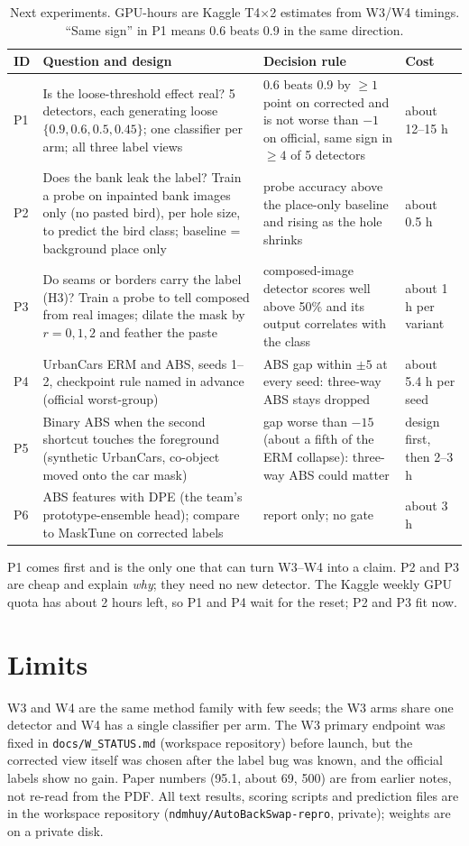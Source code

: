\documentclass[runningheads]{llncs}
\begin{document}
\begin{table}[H]
\centering
\caption{Next experiments. GPU-hours are Kaggle T4$\times$2 estimates from W3/W4 timings. ``Same sign'' in P1 means 0.6 beats 0.9 in the same direction.}
\label{tab:prop}
\small
\begin{tabular}{@{}p{0.8cm}p{4.4cm}p{4.7cm}p{2.1cm}@{}}
\toprule
ID & Question and design & Decision rule & Cost\\
\midrule
P1 & Is the loose-threshold effect real? 5 detectors, each generating loose $\{0.9,0.6,0.5,0.45\}$; one classifier per arm; all three label views & 0.6 beats 0.9 by $\ge1$ point on corrected and is not worse than $-1$ on official, same sign in $\ge4$ of 5 detectors & about 12--15 h\\
P2 & Does the bank leak the label? Train a probe on inpainted bank images only (no pasted bird), per hole size, to predict the bird class; baseline = background place only & probe accuracy above the place-only baseline and rising as the hole shrinks & about 0.5 h\\
P3 & Do seams or borders carry the label (H3)? Train a probe to tell composed from real images; dilate the mask by $r=0,1,2$ and feather the paste & composed-image detector scores well above 50\% and its output correlates with the class & about 1 h per variant\\
P4 & UrbanCars ERM and ABS, seeds 1--2, checkpoint rule named in advance (official worst-group) & ABS gap within $\pm5$ at every seed: three-way ABS stays dropped & about 5.4 h per seed\\
P5 & Binary ABS when the second shortcut touches the foreground (synthetic UrbanCars, co-object moved onto the car mask) & gap worse than $-15$ (about a fifth of the ERM collapse): three-way ABS could matter & design first, then 2--3 h\\
P6 & ABS features with DPE (the team's prototype-ensemble head); compare to MaskTune on corrected labels & report only; no gate & about 3 h\\
\bottomrule
\end{tabular}
\end{table}

P1 comes first and is the only one that can turn W3--W4 into a claim. P2 and P3 are cheap and explain \emph{why}; they need no new detector. The Kaggle weekly GPU quota has about 2 hours left, so P1 and P4 wait for the reset; P2 and P3 fit now.

\section{Limits}

W3 and W4 are the same method family with few seeds; the W3 arms share one detector and W4 has a single classifier per arm. The W3 primary endpoint was fixed in \texttt{docs/W\_STATUS.md} (workspace repository) before launch, but the corrected view itself was chosen after the label bug was known, and the official labels show no gain. Paper numbers (95.1, about 69, 500) are from earlier notes, not re-read from the PDF. All text results, scoring scripts and prediction files are in the workspace repository (\texttt{ndmhuy/AutoBackSwap-repro}, private); weights are on a private disk.
\end{document}
